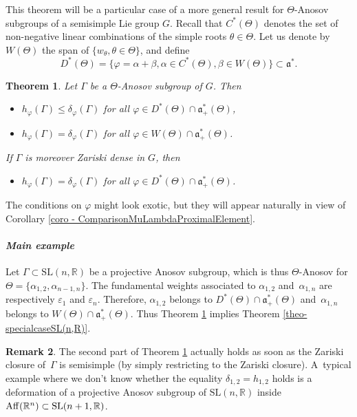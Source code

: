 \documentclass[JEP,XML,SOM,Unicode,NoEqCountersInSection,NoFloatCountersInSection,published]{cedram}
\newtheorem{theo}{Theorem}[section]
\theoremstyle{definition}
\newtheorem{rmk}[theo]{Remark}
\newcommand{\R}{\mathbb{R}}
\newcommand{\SL}{\mathrm{SL}}
\newcommand{\fa}{\mathfrak{a}}
\let\epsilon\varepsilon
\let\phi\varphi
\let\G\Gamma
\begin{document}
This theorem will be a particular case of a more general result for $\Theta$-Anosov subgroups of a semisimple Lie group $G$. Recall that $C^*(\Theta)$ denotes the set of non-negative linear combinations of the simple roots $\theta \in \Theta$. Let us denote by $W(\Theta)$ the span of $\{w_\theta, \theta \in \Theta\}$, and define
\[D^*(\Theta) = \{\phi = \alpha + \beta, \alpha \in C^*(\Theta), \beta \in W(\Theta)\} \subset \fa^*.\]

\begin{theo} \label{theo-GeneralComparisonEntropyCriticalExponent}
Let $\Gamma$ be a $\Theta$-Anosov subgroup of $G$. Then
\begin{itemize}
\item $h_\phi(\Gamma) \leq \delta_\phi(\Gamma)$ for all $\phi\in D^*(\Theta)\cap \fa_+^*(\Theta)$,
\item $h_\phi(\Gamma) = \delta_\phi(\Gamma)$ for all $\phi \in W(\Theta)\cap \fa_+^*(\Theta)$.
\end{itemize}

If $\G$ is moreover Zariski dense in $G$, then
\begin{itemize}
\item $h_\phi(\G) =\delta_\phi(\G)$ for all $\phi \in D^*(\Theta)\cap \fa_+^*(\Theta)$.
\end{itemize}
\end{theo}

The conditions on $\phi$ might look exotic, but they will appear naturally in view of Corollary \ref{coro - ComparisonMuLambdaProximalElement}.

\paragraph{{\it Main example}} Let $\G \subset \SL(n,\R)$ be a projective Anosov subgroup, which is thus $\Theta$\nobreakdash-Anosov for $\Theta=\{\alpha_{1,2}, \alpha_{n-1,n}\}$. The fundamental weights associated to $\alpha_{1,2}$ and~$\alpha_{1,n}$ are respectively $\epsilon_1$ and $\epsilon_n$. Therefore, $\alpha_{1,2}$ belongs to
$D^*(\Theta)\cap \fa_+^*(\Theta)$ and~$\alpha_{1,n}$ belongs to $W(\Theta)\cap \fa_+^*(\Theta)$. Thus Theorem \ref{theo-GeneralComparisonEntropyCriticalExponent} implies Theorem \ref{theo-specialcaseSL(n,R)}.

\begin{rmk}
The second part of Theorem \ref{theo-GeneralComparisonEntropyCriticalExponent} actually holds as soon as the Zariski closure of\, $\G$ is semisimple (by simply restricting to the Zariski closure). A~typical example where we don't know whether the equality $\delta_{1,2} = h_{1,2}$ holds is a defor\-mation of a projective Anosov subgroup of $\SL(n,\R)$ inside $\mathrm{Aff}(\R^n) \subset \SL(n+\nobreak1,\R)$.
\end{rmk}
\end{document}
